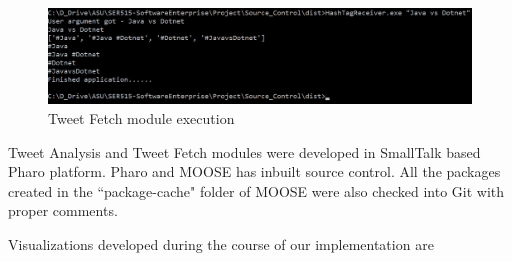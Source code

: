 \documentclass[11pt]{article}
\begin{document}
\begin{figure}[h]
\centering
\includegraphics[width=\textwidth]{TweetFetchImp.jpg}
\caption{Tweet Fetch module execution}
\end{figure}

Tweet Analysis and Tweet Fetch modules were developed in SmallTalk based Pharo platform. Pharo and MOOSE has inbuilt source control. All the packages created in the ``package-cache" folder of MOOSE were also checked into Git\cite{GITSource} with proper comments.

Visualizations developed during the course of our implementation are
\end{document}
